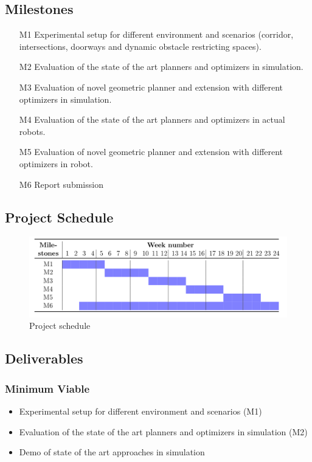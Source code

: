 \documentclass[rnd]{mas_proposal}
\begin{document}
\subsection{Milestones}
\begin{enumerate}
    \item[M1] Experimental setup for different environment and scenarios (corridor, intersections, doorways and dynamic obstacle restricting spaces).
    \item[M2] Evaluation of the state of the art planners and optimizers in simulation.
    \item[M3] Evaluation of novel geometric planner and extension with different optimizers in simulation.
    \item[M4] Evaluation of the state of the art planners and optimizers in actual robots.
    \item[M5] Evaluation of novel geometric planner and extension with different optimizers in robot.
    \item[M6] Report submission
\end{enumerate}

\subsection{Project Schedule}
\begin{figure}[!ht]
\centering
\includegraphics[scale=0.5]{images/gantt_chart.png}
\caption{Project schedule}
\label{Fig:chart}
\end{figure}

\subsection{Deliverables}
\subsubsection*{Minimum Viable}

\begin{itemize}
    \item Experimental setup for different environment and scenarios (M1)
    \item Evaluation of the state of the art planners and optimizers in simulation (M2)
    \item Demo of state of the art approaches in simulation
\end{itemize}
\end{document}
